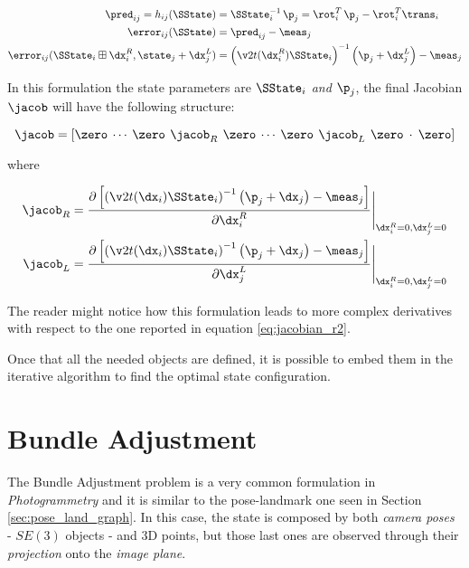\begin{align*}
    \pred_{ij} = h_{ij}(\SState) &= \SState_i^{-1} \, \p_j = \rot_{i}^T\,\p_j - \rot_{i}^T\trans_i \\
    \error_{ij}(\SState) &= \pred_{ij} - \meas_j \\
    \error_{ij}(\SState_i \boxplus \dx_i^R, \state_j + \dx_j^L) &= \left(\v2t(\dx_i^R)\SState_i\right)^{-1}\left(\p_j + \dx_j^L\right) - \meas_j
\end{align*}

In this formulation the state parameters are $\SState_i$ \textit{and} $\p_j$, the final Jacobian $\jacob$ will have the following structure:

\begin{equation*}
    \jacob = \left[\zero \: \cdots \: \zero \:\, \jacob_R \,\: \zero \: \cdots \: \zero \:\, \jacob_L \,\: \zero \: \cdot \: \zero\right]
\end{equation*}

\noindent where 

\begin{align}
    \label{eq:jac_p_se2}
    \jacob_R &= \frac{\partial \left[\left(\v2t(\dx_i)\SState_i\right)^{-1}\left(\p_j + \dx_j\right) - \meas_j\right]}{\partial\dx_i^R}\Bigg \rvert_{\dx_i^R = 0, \dx_j^L = 0} \\
    \label{eq:jac_l_se2}
    \jacob_L &= \frac{\partial \left[\left(\v2t(\dx_i)\SState_i\right)^{-1}\left(\p_j + \dx_j\right) - \meas_j\right]}{\partial\dx_j^L}\Bigg \rvert_{\dx_i^R = 0, \dx_j^L = 0}
\end{align}

\noindent The reader might notice how this formulation leads to more complex derivatives with respect to the one reported in equation \ref{eq:jacobian_r2}.

\vspace{10px}

Once that all the needed objects are defined, it is possible to embed them in the iterative algorithm to find the optimal state configuration.

\section{Bundle Adjustment}\label{sec:bundle_asjustment}
The Bundle Adjustment problem is a very common formulation in \textit{Photogrammetry} and it is similar to the pose-landmark one seen in Section \ref{sec:pose_land_graph}. In this case, the state is composed by both \textit{camera poses} - $SE(3)$ objects - and 3D points, but those last ones are observed through their \textit{projection} onto the \textit{image plane}.

